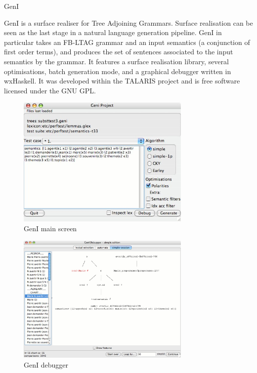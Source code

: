 \begin{hcarentry}[updated]{GenI}
\label{geni}
\makeheader

GenI is a surface realiser for Tree Adjoining Grammars. Surface
realisation can be seen as the last stage in a natural language
generation pipeline. GenI in particular takes an FB-LTAG grammar and an
input semantics (a conjunction of first order terms), and produces the
set of sentences associated to the input semantics by the grammar.  It
features a surface realisation library, several optimisations, batch
generation mode, and a graphical debugger written in wxHaskell.  It was
developed within the TALARIS project and is free software licensed under
the GNU GPL.

\begin{figure}[h]
\begin{center}
\includegraphics[width=0.75\textwidth]{GenI-main-screenshot}
\caption{GenI main screen}
\end{center}
\end{figure}

\begin{figure}[h]
\begin{center}
\includegraphics[width=0.75\textwidth]{GenI-debugger-screenshot}
\caption{GenI debugger}
\end{center}
\end{figure}


\end{hcarentry}
